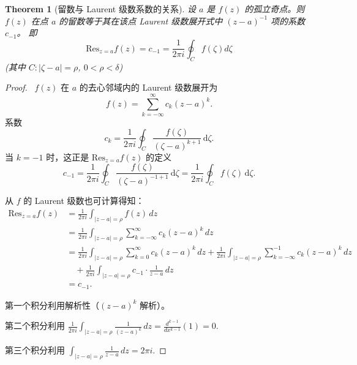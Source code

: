 \documentclass[linespread=1.5,openany]{book}%
\def\diff{d}%
\theoremstyle{plain}
\newtheorem{theorem}{Theorem}
\newcommand{\diff}{\mathop{}\!\mathrm{d}}  %
\begin{document}
{{{{{{{									\begin{theorem}[留数与 Laurent 级数系数的关系] \label{thm:L16_residue_laurent_coeff}
										设 $a$ 是 $f(z)$ 的孤立奇点。则 $f(z)$ 在点 $a$ 的留数等于其在该点 Laurent 级数展开式中 $(z-a)^{-1}$ 项的系数 $c_{-1}$。
										即
										\begin{equation}
											\text{Res}_{z=a} f(z) = c_{-1} = \frac{1}{2\pi i} \oint_{C} f(\zeta) \diff \zeta 
										\end{equation}
										(其中 $C: |\zeta-a|=\rho$, $0 < \rho < \delta$)
									\end{theorem}
									\begin{proof}\
										$f(z)$ 在 $a$ 的去心邻域内的 Laurent 级数展开为
										\[
										f(z) = \sum_{k=-\infty}^{\infty} c_k (z-a)^k.
										\]
										系数
										\[
										c_k = \frac{1}{2\pi i} \oint_C \frac{f(\zeta)}{(\zeta-a)^{k+1}} \, \mathrm{d}\zeta.
										\]
										当 $k = -1$ 时，这正是 $\text{Res}_{z=a} f(z)$ 的定义
										\[
										c_{-1} = \frac{1}{2\pi i} \oint_C \frac{f(\zeta)}{(\zeta-a)^{-1+1}} \, \mathrm{d}\zeta = \frac{1}{2\pi i} \oint_C f(\zeta) \, \mathrm{d}\zeta.
										\]
										
										
										从 $f$ 的 Laurent 级数也可计算得知：
										\begin{align*}
											\text{Res}_{z=a} f(z) &= \frac{1}{2\pi i} \int_{|z-a|=\rho} f(z) \, dz \\
											&= \frac{1}{2\pi i} \int_{|z-a|=\rho} \sum_{k=-\infty}^{\infty} c_k (z-a)^k \, dz \\
											&= \frac{1}{2\pi i} \int_{|z-a|=\rho} \sum_{k=0}^{\infty} c_k (z-a)^k \, dz + \frac{1}{2\pi i} \int_{|z-a|=\rho} \sum_{k=-\infty}^{-1} c_k (z-a)^k \, dz \\
											&\quad + \frac{1}{2\pi i} \int_{|z-a|=\rho} c_{-1} \cdot \frac{1}{z-a} \, dz \\
											&= c_{-1}.
										\end{align*}
										
										
										第一个积分利用解析性（$(z-a)^k$ 解析）。
										
										第二个积分利用 $\frac{1}{2\pi i} \int_{|z-a|=\rho} \frac{1}{(z-a)^k} \, dz = \frac{d^{k-1}}{dx^{k-1}} (1) = 0$.
										
										第三个积分利用 $\int_{|z-a|=\rho} \frac{1}{z-a} \, dz = 2\pi i$.
									\end{proof}
									
									
									
}}}}}}}
\end{document}
